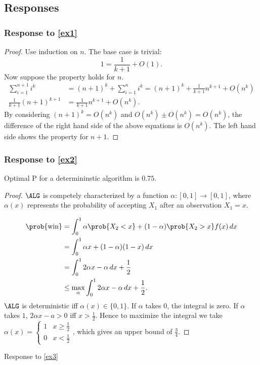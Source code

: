 \subsection{Responses}
\subsubsection{
	Response to \eqref{ex1}
}
\begin{proof}
	
Use induction on $n$. The base case is trivial: \[
1 = \frac{1}{k+1}+ O(1)
.\] 
Now suppose the property holds for $n$.
\begin{align*}
	\sum_{i=1}^{n+1} {i^k}&= (n+1)^k + \sum_{i=1}^{n} {i^k} = (n+1)^k + \frac{1}{k+1}n^{k+1} + O(n^k) \\
	\frac{1}{k+1}(n+1)^{k+1} &= \frac{1}{k+1}n^{k+1} + O(n^k)
.\end{align*}
By considering $(n+1)^k = O(n^k)$ and $O(n^k) \pm O(n^k) = O(n^k)$, the difference of the right hand side of the above equations is $O(n^k)$. The left hand side shows the property for $n+1$.
\end{proof}

\subsubsection{
	Response to \eqref{ex2}
}
Optimal P for a determininstic algorithm is $0.75$.
\begin{proof}
	$\ALG$ is competely characterized by a function $\alpha: [0,1] \to [ 0,1 ]$, where $\alpha(x)$ represents the probability of accepting  $X_1$ after an observation $X_1 = x$.

\begin{align*}
	\prob{\text{win}} 
	&= \int_0^1 \alpha \prob{X_2<x} + (1-\alpha)\prob{X_2>x} f(x) \, dx \\
	&= \int_0^1 \alpha x + (1-\alpha)(1-x) \,dx\\
	&= \int_0^1 2 \alpha x - \alpha \,dx + \frac{1}{2}\\
	&\le  \max_{\alpha} \int_0^1 2\alpha x - \alpha \,dx + \frac{1}{2}
.\end{align*}
$\ALG$ is deterministic iff $\alpha(x) \in \{0,1\}$. If $\alpha$ takes $0$, the integral is zero. If $\alpha$ takes $1$, $2\alpha x - a > 0$ iff $x > \frac{1}{2}$. Hence to maximize the integral we take $\alpha(x) = \begin{cases}
	1 &x\ge \frac{1}{2}\\
	0 &x<\frac{1}{2}
\end{cases}$, which gives an upper bound of $\frac{3}{4}$.
\end{proof}


Response to \eqref{ex3}

